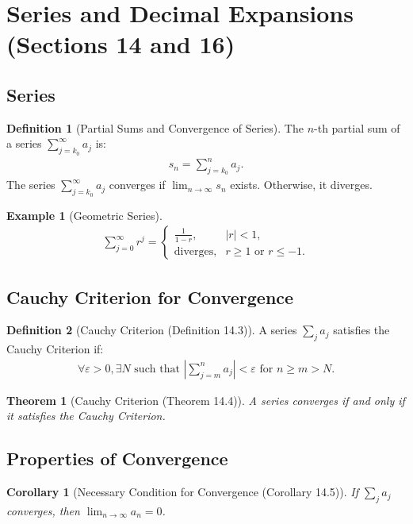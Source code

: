 \documentclass[9pt]{article}
\theoremstyle{definition}
\newtheorem{definition}{Definition}
\theoremstyle{plain}
\newtheorem{theorem}{Theorem}
\newtheorem{example}{Example}
\newtheorem{corollary}{Corollary}
\begin{document}
\section*{Series and Decimal Expansions (Sections 14 and 16)}

\subsection*{Series}
\begin{definition}[Partial Sums and Convergence of Series]
The $ n $-th partial sum of a series $ \sum_{j=k_0}^\infty a_j $ is:
\begin{align}
s_n = \sum_{j=k_0}^n a_j.
\end{align}
The series $ \sum_{j=k_0}^\infty a_j $ converges if $ \lim_{n \to \infty} s_n $ exists. Otherwise, it diverges.
\end{definition}

\begin{example}[Geometric Series]
\begin{align}
\sum_{j=0}^\infty r^j =
\begin{cases}
\frac{1}{1-r}, & |r| < 1, \\
\text{diverges}, & r \geq 1 \text{ or } r \leq -1.
\end{cases}
\end{align}
\end{example}

\subsection*{Cauchy Criterion for Convergence}
\begin{definition}[Cauchy Criterion (Definition 14.3)]
A series $ \sum_j a_j $ satisfies the Cauchy Criterion if:
\begin{align}
\forall \varepsilon > 0, \exists N \text{ such that } \left|\sum_{j=m}^n a_j\right| < \varepsilon \text{ for } n \geq m > N.
\end{align}
\end{definition}

\begin{theorem}[Cauchy Criterion (Theorem 14.4)]
A series converges if and only if it satisfies the Cauchy Criterion.
\end{theorem}

\subsection*{Properties of Convergence}
\begin{corollary}[Necessary Condition for Convergence (Corollary 14.5)]
If $ \sum_j a_j $ converges, then $ \lim_{n \to \infty} a_n = 0 $.
\end{corollary}
\end{document}
